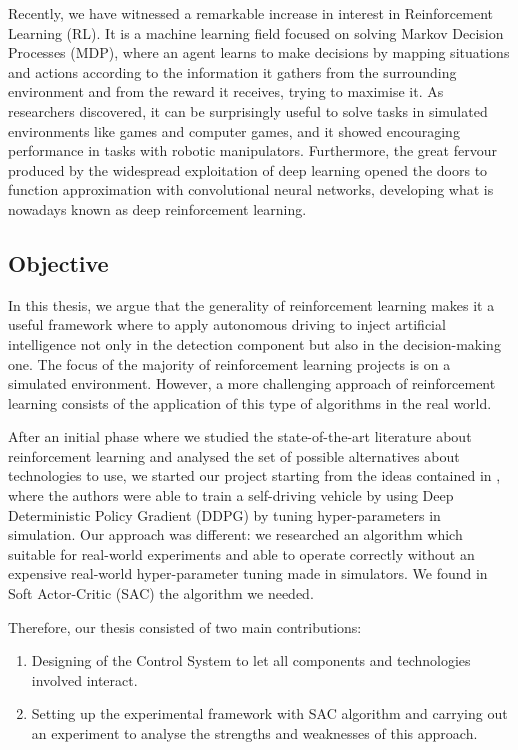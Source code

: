 \documentclass[10pt,twocolumn,letterpaper]{article}
\begin{document}
Recently, we have witnessed a remarkable increase in interest in Reinforcement Learning (RL).
It is a machine learning field focused on solving Markov Decision Processes (MDP), where an agent learns to make decisions by mapping situations and actions according to the information it gathers from the surrounding environment and from the reward it receives, trying to maximise it.
As researchers discovered, it can be surprisingly useful to solve tasks in simulated environments like games and computer games, and it showed encouraging performance in tasks with robotic manipulators.
Furthermore, the great fervour produced by the widespread exploitation of deep learning opened the doors to function approximation with convolutional neural networks, developing what is nowadays known as deep reinforcement learning.

\subsection{Objective}

In this thesis, we argue that the generality of reinforcement learning makes it a useful framework where to apply autonomous driving to inject artificial intelligence not only in the detection component but also in the decision-making one.
The focus of the majority of reinforcement learning projects is on a simulated environment.
However, a more challenging approach of reinforcement learning consists of the application of this type of algorithms in the real world.

After an initial phase where we studied the state-of-the-art literature about reinforcement learning and analysed the set of possible alternatives about technologies to use, we started our project starting from the ideas contained in \cite{kendall2019learning}, where the authors were able to train a self-driving vehicle by using Deep Deterministic Policy Gradient (DDPG) \cite{lillicrap2015continuous} by tuning hyper-parameters in simulation.
Our approach was different: we researched an algorithm which suitable for real-world experiments and able to operate correctly without an expensive real-world hyper-parameter tuning made in simulators.
We found in Soft Actor-Critic (SAC) \cite{haarnoja2018soft} the algorithm we needed.

Therefore, our thesis consisted of two main contributions:
\begin{enumerate}
    \item Designing of the Control System to let all components and technologies involved interact.
    \item Setting up the experimental framework with SAC algorithm and carrying out an experiment to analyse the strengths and weaknesses of this approach.
\end{enumerate}
\end{document}
